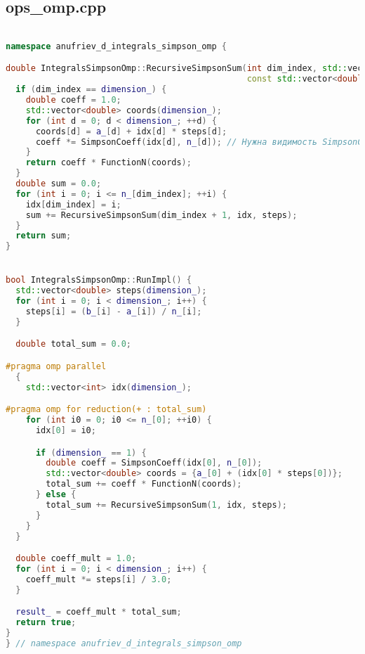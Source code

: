 \documentclass[a4paper,12pt]{article}
\begin{document}
\subsection{ops\_omp.cpp}
\begin{lstlisting}[language=C++, caption=Функция RunImpl из ops\_omp.cpp, basicstyle=\ttfamily\tiny]

namespace anufriev_d_integrals_simpson_omp {

double IntegralsSimpsonOmp::RecursiveSimpsonSum(int dim_index, std::vector<int>& idx,
                                                const std::vector<double>& steps) const {
  if (dim_index == dimension_) {
    double coeff = 1.0;
    std::vector<double> coords(dimension_);
    for (int d = 0; d < dimension_; ++d) {
      coords[d] = a_[d] + idx[d] * steps[d];
      coeff *= SimpsonCoeff(idx[d], n_[d]); // Нужна видимость SimpsonCoeff
    }
    return coeff * FunctionN(coords);
  }
  double sum = 0.0;
  for (int i = 0; i <= n_[dim_index]; ++i) {
    idx[dim_index] = i;
    sum += RecursiveSimpsonSum(dim_index + 1, idx, steps);
  }
  return sum;
}


bool IntegralsSimpsonOmp::RunImpl() {
  std::vector<double> steps(dimension_);
  for (int i = 0; i < dimension_; i++) {
    steps[i] = (b_[i] - a_[i]) / n_[i];
  }

  double total_sum = 0.0;

#pragma omp parallel
  {
    std::vector<int> idx(dimension_);

#pragma omp for reduction(+ : total_sum)
    for (int i0 = 0; i0 <= n_[0]; ++i0) {
      idx[0] = i0;

      if (dimension_ == 1) {
        double coeff = SimpsonCoeff(idx[0], n_[0]);
        std::vector<double> coords = {a_[0] + (idx[0] * steps[0])};
        total_sum += coeff * FunctionN(coords);
      } else {
        total_sum += RecursiveSimpsonSum(1, idx, steps);
      }
    }
  }

  double coeff_mult = 1.0;
  for (int i = 0; i < dimension_; i++) {
    coeff_mult *= steps[i] / 3.0;
  }

  result_ = coeff_mult * total_sum;
  return true;
}
} // namespace anufriev_d_integrals_simpson_omp
\end{lstlisting}

\newpage
\end{document}
